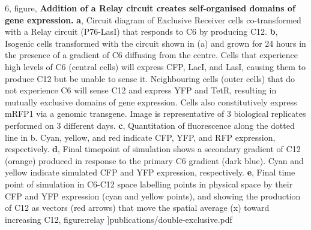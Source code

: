 {        6, figure, {\textbf{Addition of a Relay circuit creates self-organised domains of gene expression.} \textbf{a}, Circuit diagram of Exclusive Receiver cells co-transformed with a  Relay circuit  (P76-LasI) that responds to C6 by producing C12. \textbf{b}, Isogenic cells transformed with the circuit shown in (a) and grown for 24 hours in the presence of a gradient of C6 diffusing from the centre. Cells that experience high levels of C6 (central cells) will express CFP, LacI, and LasI, causing them to produce C12 but be unable to sense it.  Neighbouring cells (outer cells) that do not experience C6 will sense C12 and express YFP and TetR, resulting in mutually exclusive domains of gene expression.{ Cells also constitutively express mRFP1 via a genomic transgene. Image is representative of 3 biological replicates performed on 3 different days.} \textbf{c}, Quantitation of fluorescence along the dotted line in b. Cyan, yellow, and red indicate CFP, YFP, and RFP expression, respectively. \textbf{d}, Final timepoint of simulation shows a secondary gradient of C12 (orange) produced in response to the primary C6 gradient (dark blue).  Cyan and yellow indicate simulated CFP and YFP expression, respectively.  \textbf{e}, Final time point of simulation in C6-C12 space labelling points in physical space by their CFP and YFP expression (cyan and yellow points), and showing the production of C12 as vectors (red arrows) that move the spatial average (x) toward increasing C12}, figure:relay
}]{publications/double-exclusive.pdf}